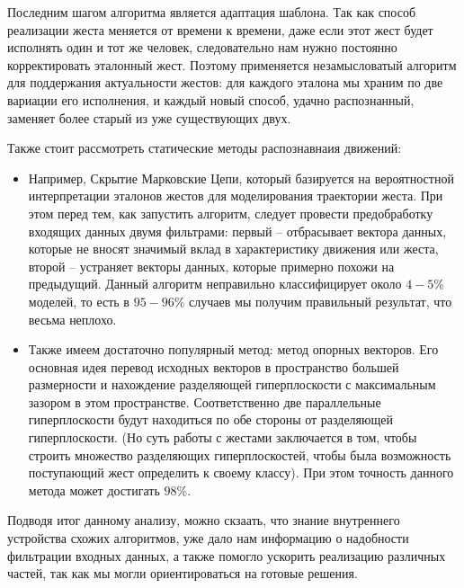 Последним шагом алгоритма является адаптация шаблона. Так как способ реализации жеста меняется от времени к времени, даже если этот жест будет исполнять один и тот же человек, следовательно нам нужно постоянно корректировать эталонный жест. Поэтому применяется незамысловатый алгоритм для поддержания актуальности жестов: для каждого эталона мы храним по две вариации его исполнения, и каждый новый способ, удачно распознанный, заменяет более старый из уже существующих двух.

Также стоит рассмотреть статические методы распознавнаия движений:
\begin{itemize}
    \item Например, Скрытие Марковские Цепи, который базируется на вероятностной интерпретации эталонов жестов для моделирования траектории жеста. При этом перед тем, как запустить алгоритм, следует провести предобработку входящих данных двумя фильтрами: первый -- отбрасывает вектора данных, которые не вносят значимый вклад в характеристику движения или жеста, второй – устраняет векторы данных, которые примерно похожи на предыдущий. Данный алгоритм неправильно классифицирует около $4-5 \%$ моделей, то есть в $95-96 \%$  случаев мы получим правильный результат, что весьма неплохо.
    \item Также имеем достаточно популярный метод: метод опорных векторов. Его основная идея перевод исходных векторов в пространство большей размерности и нахождение разделяющей гиперплоскости с максимальным зазором в этом пространстве. Соответственно две параллельные гиперплоскости будут находиться по обе стороны от разделяющей гиперплоскости. (Но суть работы с жестами заключается в том, чтобы строить множество разделяющих гиперплоскостей, чтобы была возможность поступающий жест определить к своему классу). При этом точность данного метода может достигать $98 \%$.
\end{itemize}

Подводя итог данному анализу, можно скзаать, что знание внутреннего устройства схожих алгоритмов, уже дало нам информацию о надобности фильтрации входных данных, а также помогло ускорить реализацию различных частей, так как мы могли ориентироваться на готовые решения.